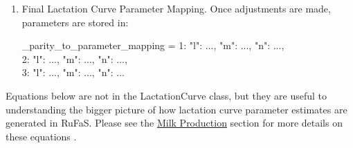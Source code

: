 \documentclass{article}
\begin{document}
\begin{refsection}
\begin{enumerate}
\begin{itemize}
            

        \begin{tcolorbox}[colback=white, colframe=black, boxrule=0.5pt, arc=3pt, width=\textwidth]
            118\% and 125\% are assumptions made based on the work by \textcite{Li2022}. 
        \end{tcolorbox}

            
            \item Fit l Parameter Using Optimization: (\_fit\_wood\_l\_param\_to\_milk\_yield). 
            The error function is defined as: (\_calculate\_305\_day\_milk\_yield\_error)
            \vspace{0.5cm}
            
            \begin{center}
                \(Error = Predicted\ MilkYield{305} - Target\ MilkYield{305} \)
            \end{center}
            \vspace{0.5cm}
            
            {\raggedleft \textbf{[AN.MLK.8]}\par}
            \vspace{0.5cm}
            
            Using Scipy's minimize function, the l parameter is iteratively adjusted to minimize this error.
        \end{itemize}
        
        \item Final Lactation Curve Parameter Mapping. Once adjustments are made, parameters are stored in:
        \vspace{0.5cm}
        
        \_parity\_to\_parameter\_mapping = {1: {"l": ..., "m": ..., "n": ...}, \\
                                            2: {"l": ..., "m": ..., "n": ...}, \\
                                            3: {"l": ..., "m": ..., "n": ...}}
                                            \vspace{0.2cm}


    \end{enumerate}

        
    Equations below are not in the LactationCurve class, but they are useful to understanding the bigger picture of how lactation curve parameter estimates are generated in RuFaS. Please see the \hyperref[milkprod]{Milk Production} section for more details on these equations \parencite{Wood1967}.
    \vspace{0.5cm}


\end{refsection}
\end{document}
